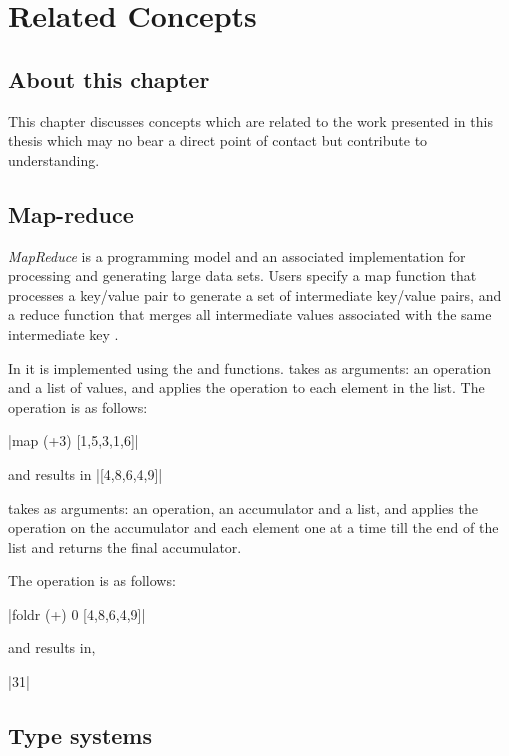 \documentclass[proposal.tex]{subfiles}
\begin{document}
\chapter{Related Concepts}\label{chap:relatedWork}


\section{About this chapter}
This chapter discusses concepts which are related to the work presented in this thesis which may no bear a direct
point of contact but contribute to understanding.

\section{Map-reduce}

\textit{MapReduce} is a programming model and an associated implementation for processing and generating large data
sets.
Users specify a map function that processes a key/value pair to generate a set of intermediate key/value pairs, and
a reduce function that merges all intermediate values associated with the same intermediate key
\cite{dean2008mapreduce}.

In  it is implemented using the  and  functions.
 takes as arguments: an operation and a list of values, and applies the operation to each
element in the list.
The  operation is as follows:

|map (+3) [1,5,3,1,6]|

\noindent and results in
|[4,8,6,4,9]|

\noindent {} takes as arguments: an operation, an accumulator and a list, and applies the operation on the
accumulator and each element one at a time till the end of the list and returns the final accumulator.

The  operation is as follows:

|foldr (+) 0 [4,8,6,4,9]|

\noindent and results in,

|31|
 

\section{Type systems}
\end{document}
